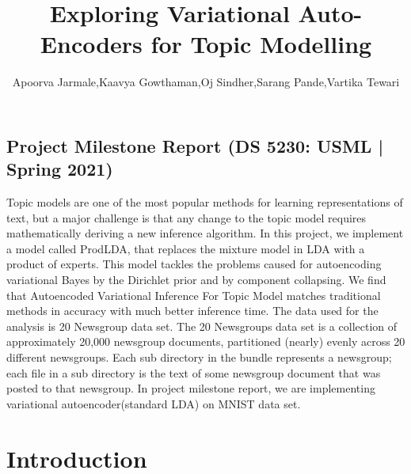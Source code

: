 \documentclass[11pt]{article}
\title{Exploring Variational Auto-Encoders for Topic Modelling}
\author{Apoorva Jarmale,Kaavya Gowthaman,Oj Sindher,Sarang Pande,Vartika Tewari}
\newcommand{\yournames}{Apoorva Jarmale, Kaavya Gowthaman, Oj Sindher, Sarang Pande, Vartika Tewari}
\theoremstyle{definition}
\theoremstyle{theorem}
\newtheorem{ques}{Question}
\begin{document}
\maketitle
\begin{center}
    \subsection*{Project Milestone Report (DS 5230: USML | Spring 2021)}
\end{center}





\abstract
Topic models are one of the most popular methods for learning representations of
text, but a major challenge is that any change to the topic model requires mathematically deriving a new inference algorithm. In this project, we implement a model called ProdLDA, that replaces the mixture model in LDA with a product
of experts. This model tackles the problems caused for autoencoding variational Bayes by the Dirichlet prior and by component collapsing. We find that Autoencoded Variational Inference For Topic Model matches traditional methods in accuracy with much better inference time. The data used for the analysis is 20 Newsgroup data set. The 20 Newsgroups data set is a collection of approximately 20,000 newsgroup documents, partitioned (nearly) evenly across 20 different newsgroups. Each sub directory in the bundle represents a newsgroup; each file in a sub directory is the text of some newsgroup document that was posted to that newsgroup. In project milestone report, we are implementing variational autoencoder(standard LDA) on MNIST data set.\\
 

\section{Introduction}
\end{document}
